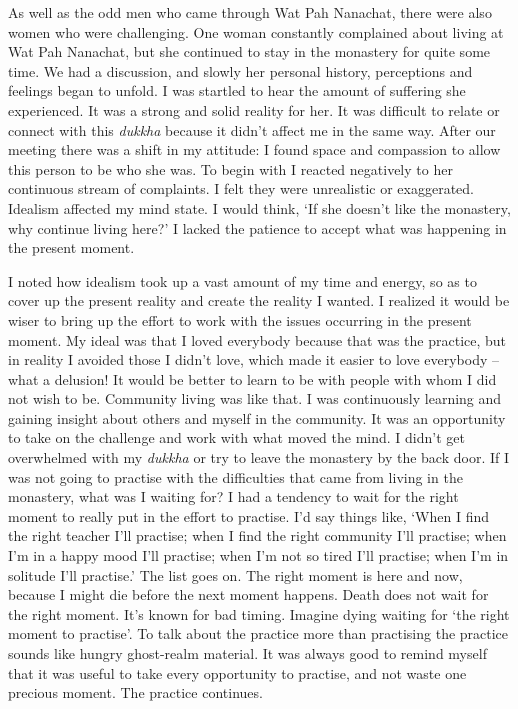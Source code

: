 As well as the odd men who came through Wat Pah Nanachat, there were
also women who were challenging. One woman constantly complained about
living at Wat Pah Nanachat, but she continued to stay in the monastery
for quite some time. We had a discussion, and slowly her personal
history, perceptions and feelings began to unfold. I was startled to
hear the amount of suffering she experienced. It was a strong and solid
reality for her. It was difficult to relate or connect with this
\emph{dukkha} because it didn't affect me in the same way. After our
meeting there was a shift in my attitude: I found space and compassion
to allow this person to be who she was. To begin with I reacted
negatively to her continuous stream of complaints. I felt they were
unrealistic or exaggerated. Idealism affected my mind state. I would
think, `If she doesn't like the monastery, why continue living here?' I
lacked the patience to accept what was happening in the present moment. 

I noted how idealism took up a vast amount of my time and energy, so as
to cover up the present reality and create the reality I wanted. I
realized it would be wiser to bring up the effort to work with the
issues occurring in the present moment. My ideal was that I loved
everybody because that was the practice, but in reality I avoided those
I didn't love, which made it easier to love everybody -- what a delusion! 
It would be better to learn to be with people with whom I did not wish
to be. Community living was like that. I was continuously learning and
gaining insight about others and myself in the community. It was an
opportunity to take on the challenge and work with what moved the mind. 
I didn't get overwhelmed with my \emph{dukkha} or try to leave the
monastery by the back door. If I was not going to practise with the
difficulties that came from living in the monastery, what was I waiting
for? I had a tendency to wait for the right moment to really put in the
effort to practise. I'd say things like, `When I find the right teacher
I'll practise; when I find the right community I'll practise; when I'm
in a happy mood I'll practise; when I'm not so tired I'll practise; when
I'm in solitude I'll practise.' The list goes on. The right moment is
here and now, because I might die before the next moment happens. Death
does not wait for the right moment. It's known for bad timing. Imagine
dying waiting for `the right moment to practise'. To talk about the
practice more than practising the practice sounds like hungry
ghost-realm material. It was always good to remind myself that it was
useful to take every opportunity to practise, and not waste one precious
moment. The practice continues. 

